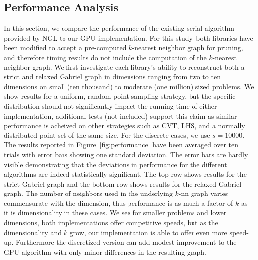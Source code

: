 \subsection{Performance Analysis}

In this section, we compare the performance of the existing serial algorithm provided by NGL to our GPU implementation.
%
For this study, both libraries have been modified to accept a pre-computed $k$-nearest neighbor graph for pruning, and therefore timing results do not include the computation of the $k$-nearest neighbor graph.
%
We first investigate each library's ability to reconstruct both a strict and relaxed Gabriel graph in dimensions ranging from two to ten dimensions on small (ten thousand) to moderate (one million) sized problems.
%
We show results for a uniform, random point sampling strategy, but the specific distribution should not significantly impact the running time of either implementation, additional tests (not included) support this claim as similar performance is acheived on other strategies such as CVT, LHS, and a normally distributed point set of the same size.
%
For the discrete cases, we use $s=10000$.
%
The results reported in Figure~\ref{fig:performance} have been averaged over ten trials with error bars showing one standard deviation.
%
The error bars are hardly visible demonstrating that the deviations in performance for the different algorithms are indeed statistically significant.
%
The top row shows results for the strict Gabriel graph and the bottom row shows results for the relaxed Gabriel graph.
%
The number of neighbors used in the underlying $k$-nn graph varies commensurate with the dimension, thus performance is as much a factor of $k$ as it is dimensionality in these cases.
%
We see for smaller problems and lower dimensions, both implementations offer competitive speeds, but as the dimensionality and $k$ grow, our implementation is able to offer even more speed-up.
%
Furthermore the discretized version can add modest improvement to the GPU algorithm with only minor differences in the resulting graph.

